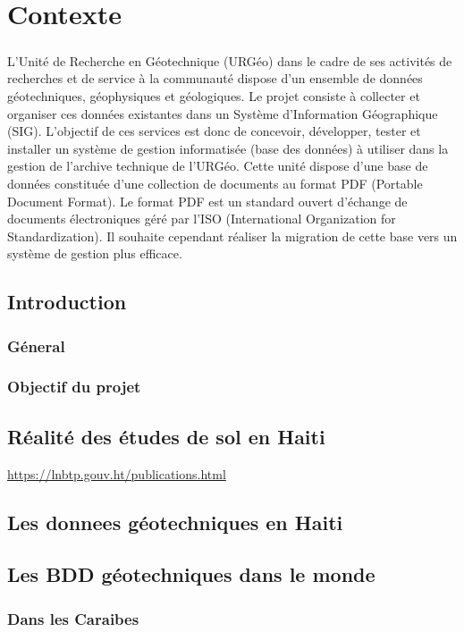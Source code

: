 \chapter*{Contexte}
\paragraph{}
L’Unité de Recherche en Géotechnique (URGéo) dans le cadre de ses activités de recherches et de service à
la communauté dispose d’un ensemble de données géotechniques, géophysiques et géologiques. Le projet
consiste à collecter et organiser ces données existantes dans un Système d’Information Géographique (SIG).
L’objectif de ces services est donc de concevoir, développer, tester et installer un système de gestion
informatisée (base des données) à utiliser dans la gestion de l’archive technique de l’URGéo. Cette unité
dispose d'une base de données constituée d’une collection de documents au format PDF (Portable Document
Format). Le format PDF est un standard ouvert d'échange de documents électroniques géré par l’ISO
(International Organization for Standardization). Il souhaite cependant réaliser la migration de cette base vers
un système de gestion plus efficace.
    \section{Introduction}
        \subsection{Géneral}
        \lipsum[1]
        \subsection{Objectif du projet}
        \lipsum[1]
    \section{Réalité des études de sol en Haiti}
    \url{https://lnbtp.gouv.ht/publications.html}
    \lipsum[1]
    \section{Les donnees géotechniques en Haiti}
    \lipsum[1]
    \section{Les BDD géotechniques dans le monde}
        \subsection{Dans les Caraibes}
        \lipsum[1]
